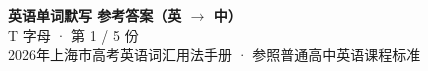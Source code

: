 \documentclass[10pt,a4paper]{article}
\begin{document}
\pagestyle{plain}

\begin{center}
{\LARGE\bfseries 英语单词默写 \quad 参考答案（英 $\to$ 中）}\\[0.22em]
{\large T 字母 · 第 1 / 5 份}\\[0.18em]
{\small 2026年上海市高考英语词汇用法手册 · 参照普通高中英语课程标准}
\end{center}

\vspace{0.2em}
\noindent{\color{rulegray}\rule{\textwidth}{0.8pt}}

\vspace{0.35em}

\vspace{0.25em}
\renewcommand{\arraystretch}{1.32}
\end{document}
